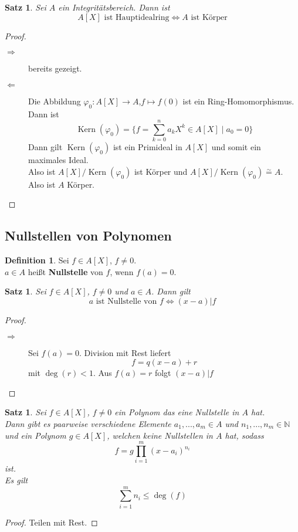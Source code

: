 \documentclass[10pt,a4paper]{article}
\newcommand{\N}{\ensuremath{\mathbb{N}}}
\newcommand{\isom}{\overset{\sim}{=}}
\newcommand{\Kern}{\operatorname{Kern}}
\theoremstyle{plain}
\newtheorem{satz}[theorem]{Satz}
\theoremstyle{definition}
\newtheorem{definition}[theorem]{Definition}
\theoremstyle{remark}
\begin{document}
	\begin{satz}
		Sei $A$ ein Integritätsbereich. Dann ist
		\[\text{$A[X]$ ist Hauptidealring}\Leftrightarrow A\text{ ist Körper}\]
	\end{satz}

	\begin{proof}
		\begin{description}
			\item[$\Rightarrow$] bereits gezeigt.
			\item[$\Leftarrow$] Die Abbildung $\varphi_0:A[X]\to A$,$f\mapsto f(0)$ ist ein Ring-Homomorphismus. Dann ist
			\[\Kern(\varphi_0)=\{f=\sum_{k=0}^{n}a_kX^k\in A[X]\mid a_0=0\}\]
			Dann gilt $\Kern(\varphi_0)$ ist ein Primideal in $A[X]$ und somit ein maximales Ideal.\\
			Also ist $A[X]/\Kern(\varphi_0)$ ist Körper und $A[X]/\Kern(\varphi_0)\isom A$.\\
			Also ist $A$ Körper.
		\end{description}
	\end{proof}


	\subsection{Nullstellen von Polynomen}
	\begin{definition}
		Sei $f\in A[X]$, $f\neq 0$.\\
		$a\in A$ heißt \textbf{Nullstelle} von $f$, wenn $f(a)=0$.
	\end{definition}

	\begin{satz}
		Sei $f\in A[X]$, $f\neq 0$ und $a\in A$. Dann gilt
		\[\text{$a$ ist Nullstelle von $f$}\Leftrightarrow (x-a)|f\]
	\end{satz}
	\begin{proof}
		\begin{description}
			\item[$\Rightarrow$] Sei $f(a)=0$. Division mit Rest liefert
			\[ f=q(x-a)+r\]
			mit $\deg(r)< 1$. Aus $f(a)=r$ folgt $(x-a)|f$
		\end{description}
	\end{proof}

	\begin{satz}
		Sei $f\in A[X]$, $f\neq 0$ ein Polynom das eine Nullstelle in $A$ hat.\\
		Dann gibt es paarweise verschiedene Elemente $a_1,...,a_m\in A$ und $n_1,...,n_m\in\N$ und ein Polynom $g\in A[X]$, welchen keine Nullstellen in $A$ hat, sodass
		\[f=g\prod_{i=1}^m(x-a_i)^{n_i}\]
		ist.\\
		Es gilt
		\[\sum_{i=1}^{m}n_i\leq\deg(f)\]
	\end{satz}
	\begin{proof}
		Teilen mit Rest.
	\end{proof}
\end{document}
